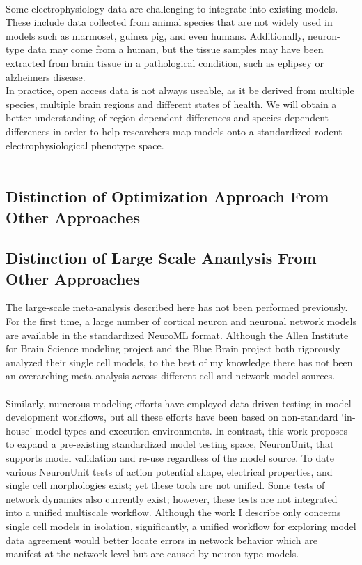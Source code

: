 \\
Some electrophysiology data are challenging to integrate into existing models.
These include data collected from animal species that are not widely used in models such as marmoset, guinea pig, and even humans. 
Additionally, neuron-type data may come from a human, but the tissue samples may have been extracted from brain tissue in a pathological condition, such as eplipsey or alzheimers disease.
\\
In practice, open access data is not always useable, as it be derived from multiple species, multiple brain regions and different states of health. We will obtain a better understanding of region-dependent differences and species-dependent differences in order to help researchers map models onto a standardized rodent electrophysiological phenotype space.\\
\\
\subsection{Distinction of Optimization Approach From Other Approaches}


\subsection{Distinction of Large Scale Ananlysis From Other Approaches}
The large-scale meta-analysis described here has not been performed previously. For the first time, a large number of cortical neuron and neuronal network models are available in the standardized NeuroML format. Although the Allen Institute for Brain Science modeling project and the Blue Brain project both rigorously analyzed their single cell models, to the best of my knowledge there has not been an overarching meta-analysis across different cell and network model sources.\\
\\
Similarly, numerous modeling efforts have employed data-driven testing in model development workflows, but all these efforts have been based on non-standard ‘in-house’ model types and execution environments. In contrast, this work proposes to expand a pre-existing standardized model testing space, NeuronUnit, that supports model validation and re-use regardless of the model source. To date various NeuronUnit tests of action potential shape, electrical properties, and single cell morphologies exist; yet these tools are not unified. Some tests of network dynamics also currently exist; however, these tests are not integrated into a unified multiscale workflow. Although the work I describe only concerns single cell models in isolation, significantly, a unified workflow for exploring model data agreement would better locate errors in network behavior which are manifest at the network level but are caused by neuron-type models. \newline
\newline